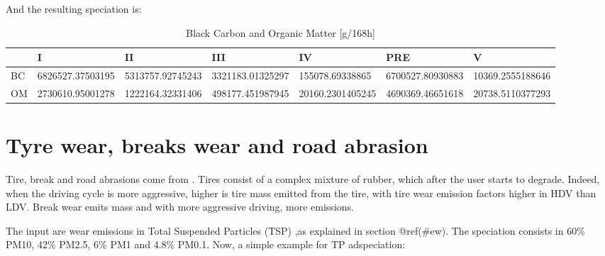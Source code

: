 \documentclass[12pt,graybox,envcountchap,sectrefs]{krantz}
\theoremstyle{definition}
\theoremstyle{definition}
\theoremstyle{definition}
\theoremstyle{remark}
\begin{document}
And the resulting speciation is:

\begin{table}

\caption{\label{tab:unnamed-chunk-84}Black Carbon and Organic Matter [g/168h]}
\centering
\begin{tabular}[t]{l|l|l|l|l|l|l}
\hline
  & I & II & III & IV & PRE & V\\
\hline
BC & 6826527.37503195 & 5313757.92745243 & 3321183.01325297 & 155078.69338865 & 6700527.80930883 & 10369.2555188646\\
\hline
OM & 2730610.95001278 & 1222164.32331406 & 498177.451987945 & 20160.2301405245 & 4690369.46651618 & 20738.5110377293\\
\hline
\end{tabular}
\end{table}

\section{Tyre wear, breaks wear and road
abrasion}\label{tyre-wear-breaks-wear-and-road-abrasion}

Tire, break and road abrasions come from
\citet{NtziachristosBoulter2009}. Tires consist of a complex mixture of
rubber, which after the user starts to degrade. Indeed, when the driving
cycle is more aggressive, higher is tire mass emitted from the tire,
with tire wear emission factors higher in HDV than LDV. Break wear emits
mass and with more aggressive driving, more emissions.

The input are wear emissions in Total Suspended Particles (TSP) ,as
explained in section @ref(\#ew). The speciation consists in 60\% PM10,
42\% PM2.5, 6\% PM1 and 4.8\% PM0.1. Now, a simple example for TP
adspeciation:
\end{document}
